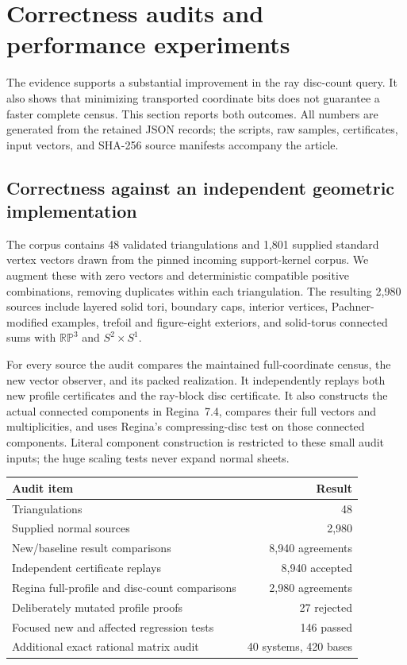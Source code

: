 \section{Correctness audits and performance experiments}
\label{sec:experiments}

The evidence supports a substantial improvement in the ray disc-count query.
It also shows that minimizing transported coordinate bits does not guarantee
a faster complete census.  This section reports both outcomes.  All numbers
are generated from the retained JSON records; the scripts, raw samples,
certificates, input vectors, and SHA-256 source manifests accompany the article.

\subsection{Correctness against an independent geometric implementation}

The corpus contains 48 validated triangulations and 1,801 supplied standard
vertex vectors drawn from the pinned incoming support-kernel corpus.  We
augment these with zero vectors and deterministic compatible positive
combinations, removing duplicates within each triangulation.  The resulting
2,980 sources include layered solid tori, boundary caps, interior vertices,
Pachner-modified examples, trefoil and figure-eight exteriors, and solid-torus
connected sums with $\mathbb{RP}^3$ and $S^2\times S^1$.

For every source the audit compares the maintained full-coordinate census,
the new vector observer, and its packed realization.  It independently
replays both new profile certificates and the ray-block disc certificate.
It also constructs the actual connected components in Regina~7.4, compares
their full vectors and multiplicities, and uses Regina's compressing-disc
test on those connected components.  Literal component construction is
restricted to these small audit inputs; the huge scaling tests never expand
normal sheets.

\begin{center}
\begin{tabular}{@{}lr@{}}
\toprule
Audit item & Result \\
\midrule
Triangulations & 48\\
Supplied normal sources & 2,980\\
New/baseline result comparisons & 8,940 agreements\\
Independent certificate replays & 8,940 accepted\\
Regina full-profile and disc-count comparisons & 2,980 agreements\\
Deliberately mutated profile proofs & 27 rejected\\
Focused new and affected regression tests & 146 passed\\
Additional exact rational matrix audit & 40 systems, 420 bases\\
\bottomrule
\end{tabular}
\end{center}

